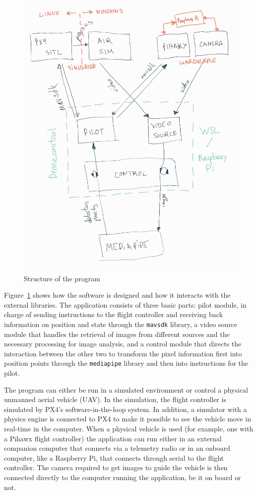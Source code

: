 \begin{figure}
  \centering
  \includegraphics[width=12cm, keepaspectratio]{img/code_diagram.jpg}
  \caption{Structure of the program}\label{fig:architecture}
\end{figure}

Figure~\ref{fig:architecture} shows how the software is designed and how it interacts with the external libraries.
The application consists of three basic parts: 
pilot module, in charge of sending instructions to the flight controller and receiving back information on position and state through the \verb|mavsdk| library, 
a video source module that handles the retrieval of images from different sources and the necessary processing for image analysis, 
and a control module that directs the interaction between the other two to transform the pixel information first into position points through the \verb|mediapipe| library and then into instructions for the pilot.

The program can either be run in a simulated environment or control a physical unmanned aerial vehicle (UAV).
In the simulation, the flight controller is simulated by PX4's software-in-the-loop system. 
In addition, a simulator with a physics engine is connected to PX4 to make it possible to see the vehicle move in real-time in the computer.
When a physical vehicle is used (for example, one with a Pihawx flight controller) the application can run either in an external companion computer that connects via a telemetry radio or in an onboard computer, like a Raspberry Pi, that connects through serial to the flight controller.
The camera required to get images to guide the vehicle is then connected directly to the computer running the application, be it on board or not.

